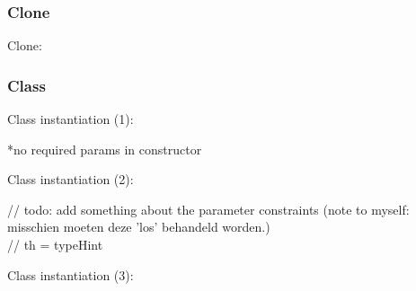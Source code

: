 \documentclass[../main.tex]{subfiles}
\begin{document}
    \subsubsection{Clone}
    Clone:
    \begin{prooftree}
    \end{prooftree}
    
    \hrulefill
    
    \subsubsection{Class}
    Class instantiation (1):
    \begin{prooftree}
    \end{prooftree}
    *no required params in constructor \\
    
    \hrulefill

    Class instantiation (2):     
    \begin{prooftree}
    \end{prooftree}
    // todo: add something about the parameter constraints (note to myself: misschien moeten deze 'los' behandeld worden.) \\
    // th = typeHint \\
    
    \hrulefill

    Class instantiation (3):    
    \begin{prooftree}
    \end{prooftree}
    
    \hrulefill
\end{document}
